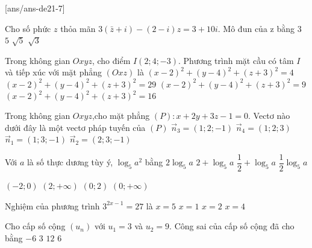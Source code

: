 
[ans/ans-de21-7]

\begin{ex}%
Cho số phức $z$ thỏa mãn $3(\bar{z}+i)-(2-i) z=3+10 i$. Mô đun của z bằng
\choice
{$3$}
{$5$}
{\True $\sqrt{5}$}
{$\sqrt{3}$}

\end{ex}
\begin{ex}%
Trong không gian $O x y z$, cho điểm $I(2; 4;-3)$. Phương trình mặt cầu có tâm $I$ và tiếp xúc với mặt phẳng $(O x z)$ là
\choice
{$(x-2)^2+(y-4)^2+(z+3)^2=4$}
{$(x-2)^2+(y-4)^2+(z+3)^2=29$}
{$(x-2)^2+(y-4)^2+(z+3)^2=9$}
{\True $(x-2)^2+(y-4)^2+(z+3)^2=16$}

\end{ex}
\begin{ex}%
Trong không gian $O x y z$,cho mặt phẳng $(P)\colon x+2 y+3 z-1=0$. Vectơ nào dưới đây là một vectơ pháp tuyến của $(P)$ 
\choice
{$\vec{n}_3=(1; 2;-1)$}
{\True $\vec{n}_4=(1; 2; 3)$}
{$\vec{n}_1=(1; 3;-1)$}
{$\vec{n}_2=(2; 3;-1)$}

\end{ex}
\begin{ex}%
Với $a$ là số thực dương tùy ý, $\log_5 a^2$ bằng
\choice
{\True $2\log_5 a$}
{$2+\log_5 a$}
{$\dfrac{1}{2}+\log_5 a$}
{$\dfrac{1}{2} \log_5 a$}

\end{ex}
\begin{ex}%
{\vspace{-0.5cm}
}
\choice
{$(-2; 0)$}
{$(2;+\infty)$}
{\True $(0; 2)$}
{$(0;+\infty)$}
\end{ex}
\begin{ex}%
Nghiệm của phương trình $3^{2 x-1}=27$ là
\choice
{$x=5$}
{$x=1$}
{\True $x=2$}
{$x=4$}

\end{ex}
\begin{ex}%
Cho cấp số cộng $\left(u_n\right)$ với $u_1=3$ và $u_2=9$. Công sai của cấp số cộng đã cho bằng
\choice
{$-6$}
{$3$}
{$12$}
{\True $6$}

\end{ex}
